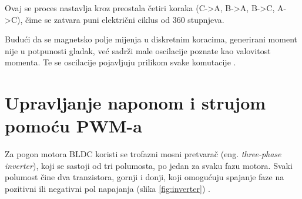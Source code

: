 \documentclass[diplomskirad]{fer}
\begin{document}
Ovaj se proces nastavlja kroz preostala četiri koraka (C->A, B->A, B->C, A->C),
čime se zatvara puni električni ciklus od 360 stupnjeva. 

Budući da se magnetsko polje mijenja u diskretnim koracima, generirani moment
nije u potpunosti gladak, već sadrži male oscilacije poznate kao valovitost
momenta. Te se oscilacije pojavljuju prilikom svake komutacije \cite{TI2015}.
\label{trap:torque-ripple} 

\newpage
\section{Upravljanje naponom i strujom pomoću PWM-a}

Za pogon motora BLDC koristi se trofazni mosni pretvarač (eng.
\textit{three-phase inverter}), koji se sastoji od tri polumosta, po jedan za
svaku fazu motora. Svaki polumost čine dva tranzistora, gornji i donji, koji
omogućuju spajanje faze na pozitivni ili negativni pol napajanja (slika
\ref{fig:inverter}) \cite{TI2015,ST_AN1946,MicrochipAN885}.
\end{document}
